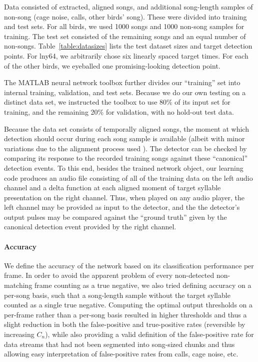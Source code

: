 \documentclass[10pt,letterpaper]{article}
\renewcommand{\subsubsection}[1]{\paragraph{#1}}
\begin{document}
Data consisted of extracted, aligned songs, and additional song-length
samples of non-song (cage noise, calls, other birds' song). These were
divided into training and test sets. For all birds, we used 1000 songs
and 1000 non-song samples for training. The test set consisted of the remaining songs and an equal number of non-songs. Table~\ref{table:datasizes}
lists the test dataset sizes and target detection points. For lny64,
we arbitrarily chose six linearly spaced target times. For each of the
other birds, we eyeballed one promising-looking detection point.

The MATLAB neural network toolbox further divides our ``training'' set
into internal training, validation, and test sets.  Because we do our
own testing on a distinct data set, we instructed the
toolbox to use 80\% of its input set for training, and the
remaining 20\% for validation, with no hold-out test data.

Because the data set consists of temporally aligned songs, the moment
at which detection should occur during each song sample is available
(albeit with minor variations due to the alignment process used
\cite{Poole2012}).  The detector can be checked by comparing its
response to the recorded training songs against these ``canonical''
detection events.  To this end, besides the trained network object,
our learning code produces an audio file consisting of all of the
training data on the left audio channel and a delta function at each
aligned moment of target syllable presentation on the right
channel. Thus, when played on any audio player, the left channel may
be provided as input to the detector, and the the detector's output
pulses may be compared against the ``ground truth'' given by the
canonical detection event provided by the right channel.


\subsubsection{Accuracy}
\label{sec:accuracy}


We define the accuracy of the network based on its classification
performance per frame. In order to avoid the apparent problem of every
non-detected non-matching frame counting as a true negative, we also
tried defining accuracy on a per-song basis, such that a song-length
sample without the target syllable counted as a single true negative.
Computing the optimal output thresholds on a per-frame rather than a
per-song basis resulted in higher thresholds and thus a slight
reduction in both the false-positive and true-positive rates
(reversible by increasing $C_n$), while also providing a valid
definition of the false-positive rate for data streams that had not been
segmented into song-sized chunks and thus allowing easy interpretation
of false-positive rates from calls, cage noise, etc.
\end{document}
